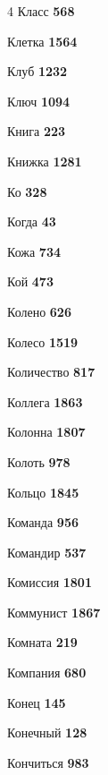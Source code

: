 \begin{multicols}{4}
\noindent Класс \dotfill \textbf{\color{secondary} 568}\par
\noindent Клетка \dotfill \textbf{\color{secondary} 1564}\par
\noindent Клуб \dotfill \textbf{\color{secondary} 1232}\par
\noindent Ключ \dotfill \textbf{\color{secondary} 1094}\par
\noindent Книга \dotfill \textbf{\color{secondary} 223}\par
\noindent Книжка \dotfill \textbf{\color{secondary} 1281}\par
\noindent Ко \dotfill \textbf{\color{secondary} 328}\par
\noindent Когда \dotfill \textbf{\color{secondary} 43}\par
\noindent Кожа \dotfill \textbf{\color{secondary} 734}\par
\noindent Кой \dotfill \textbf{\color{secondary} 473}\par
\noindent Колено \dotfill \textbf{\color{secondary} 626}\par
\noindent Колесо \dotfill \textbf{\color{secondary} 1519}\par
\noindent Количество \dotfill \textbf{\color{secondary} 817}\par
\noindent Коллега \dotfill \textbf{\color{secondary} 1863}\par
\noindent Колонна \dotfill \textbf{\color{secondary} 1807}\par
\noindent Колоть \dotfill \textbf{\color{secondary} 978}\par
\noindent Кольцо \dotfill \textbf{\color{secondary} 1845}\par
\noindent Команда \dotfill \textbf{\color{secondary} 956}\par
\noindent Командир \dotfill \textbf{\color{secondary} 537}\par
\noindent Комиссия \dotfill \textbf{\color{secondary} 1801}\par
\noindent Коммунист \dotfill \textbf{\color{secondary} 1867}\par
\noindent Комната \dotfill \textbf{\color{secondary} 219}\par
\noindent Компания \dotfill \textbf{\color{secondary} 680}\par
\noindent Конец \dotfill \textbf{\color{secondary} 145}\par
\noindent Конечный \dotfill \textbf{\color{secondary} 128}\par
\noindent Кончиться \dotfill \textbf{\color{secondary} 983}\par

\end{multicols}
